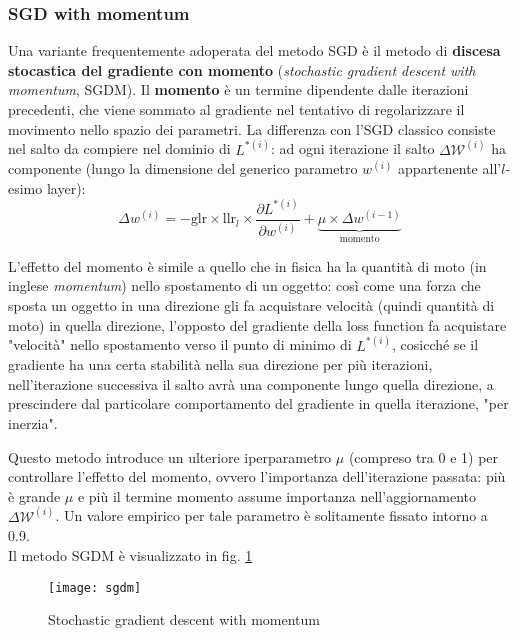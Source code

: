 \subsubsection{SGD with momentum}
Una variante frequentemente adoperata del metodo SGD è il metodo di \textbf{discesa stocastica del gradiente con momento} (\textit{stochastic gradient descent with momentum}, SGDM).
Il \textbf{momento} è un termine dipendente dalle iterazioni precedenti, che viene sommato al gradiente nel tentativo di regolarizzare il movimento nello spazio dei parametri.
La differenza con l'SGD classico consiste nel salto da compiere nel dominio di $L^{*(i)}$: ad ogni iterazione il salto $\Delta \mathcal{W}^{(i)}$ ha componente (lungo la dimensione del generico parametro $w^{(i)}$ appartenente all'$l$-esimo layer):
\[
\Delta w^{(i)}=-\text{glr}\times \text{llr}_l\times \frac{\partial L^{*(i)}}{\partial w^{(i)}}+\underbrace{\mu\times\Delta w^{(i-1)}}_{\text{momento}}
\]

L'effetto del momento è simile a quello che in fisica ha la quantità di moto (in inglese \textit{momentum}) nello spostamento di un oggetto: così come una forza che sposta un oggetto in una direzione gli fa acquistare velocità (quindi quantità di moto) in quella direzione, l'opposto del gradiente della loss function fa acquistare "velocità" nello spostamento verso il punto di minimo di $L^{*(i)}$, cosicché se il gradiente ha una certa stabilità nella sua direzione per più iterazioni, nell'iterazione successiva il salto avrà una componente lungo quella direzione, a prescindere dal particolare comportamento del gradiente in quella iterazione, "per inerzia".

Questo metodo introduce un ulteriore iperparametro $\mu$ (compreso tra 0 e 1) per controllare l'effetto del momento, ovvero l'importanza dell'iterazione passata: più è grande $\mu$ e più il termine momento assume importanza nell'aggiornamento $\Delta \mathcal{W}^{(i)}$. Un valore empirico per tale parametro è solitamente fissato intorno a 0.9.\\

Il metodo SGDM è visualizzato in fig. \ref{fig:sgdm}

\begin{figure}[h!]
\centering
\texttt{[image: sgdm]}
\caption{Stochastic gradient descent with momentum}
\label{fig:sgdm}
\end{figure}

